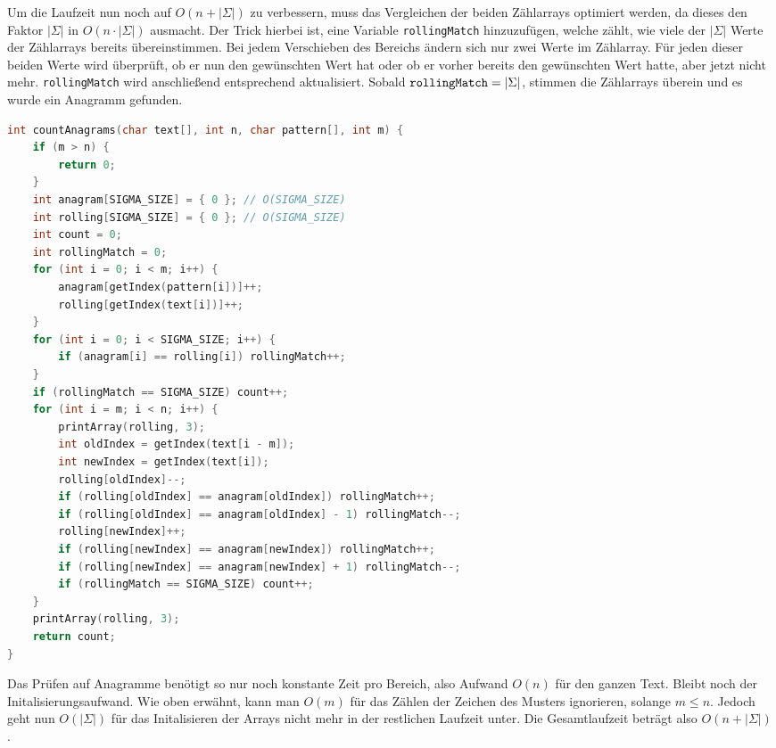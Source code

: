 \documentclass[11pt,a4paper]{article}
\begin{document}
\begin{loesung}
\begin{enumerate}
        Um die Laufzeit nun noch auf $O(n + |\Sigma|)$ zu verbessern, muss das Vergleichen der beiden Zählarrays optimiert werden, da dieses den Faktor $|\Sigma|$ in $O(n \cdot |\Sigma|)$ ausmacht.
        Der Trick hierbei ist, eine Variable \texttt{rollingMatch} hinzuzufügen, welche zählt, wie viele der $|\Sigma|$ Werte der Zählarrays bereits übereinstimmen.
        Bei jedem Verschieben des Bereichs ändern sich nur zwei Werte im Zählarray.
        Für jeden dieser beiden Werte wird überprüft, ob er nun den gewünschten Wert hat oder ob er vorher bereits den gewünschten Wert hatte, aber jetzt nicht mehr.
        \texttt{rollingMatch} wird anschließend entsprechend aktualisiert.
        Sobald $\text{\texttt{rollingMatch}} = |\Sigma|$, stimmen die Zählarrays überein und es wurde ein Anagramm gefunden.
        \begin{lstlisting}[language=c++]
int countAnagrams(char text[], int n, char pattern[], int m) {
    if (m > n) {
        return 0;
    }
    int anagram[SIGMA_SIZE] = { 0 }; // O(SIGMA_SIZE)
    int rolling[SIGMA_SIZE] = { 0 }; // O(SIGMA_SIZE)
    int count = 0;
    int rollingMatch = 0;
    for (int i = 0; i < m; i++) {
        anagram[getIndex(pattern[i])]++;
        rolling[getIndex(text[i])]++;
    }
    for (int i = 0; i < SIGMA_SIZE; i++) {
        if (anagram[i] == rolling[i]) rollingMatch++;
    }
    if (rollingMatch == SIGMA_SIZE) count++;
    for (int i = m; i < n; i++) {
        printArray(rolling, 3);
        int oldIndex = getIndex(text[i - m]);
        int newIndex = getIndex(text[i]);
        rolling[oldIndex]--;
        if (rolling[oldIndex] == anagram[oldIndex]) rollingMatch++;
        if (rolling[oldIndex] == anagram[oldIndex] - 1) rollingMatch--;
        rolling[newIndex]++;
        if (rolling[newIndex] == anagram[newIndex]) rollingMatch++;
        if (rolling[newIndex] == anagram[newIndex] + 1) rollingMatch--;
        if (rollingMatch == SIGMA_SIZE) count++;
    }
    printArray(rolling, 3);
    return count;
}
        \end{lstlisting}
        Das Prüfen auf Anagramme benötigt so nur noch konstante Zeit pro Bereich, also Aufwand $O(n)$ für den ganzen Text.
        Bleibt noch der Initalisierungsaufwand.
        Wie oben erwähnt, kann man $O(m)$ für das Zählen der Zeichen des Musters ignorieren, solange $m \leq n$.
        Jedoch geht nun $O(|\Sigma|)$ für das Initalisieren der Arrays nicht mehr in der restlichen Laufzeit unter.
        Die Gesamtlaufzeit beträgt also $O(n + |\Sigma|)$.
    \end{enumerate}
\end{loesung}
\end{document}
